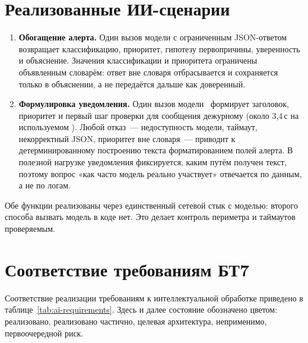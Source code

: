 \documentclass[utf8x, 12pt]{G7-32} %
\begin{document}
\section{Реализованные ИИ-сценарии}
\begin{enumerate}[1.]
    \item \textbf{Обогащение алерта.} Один вызов модели с ограниченным JSON-ответом
          возвращает классификацию, приоритет, гипотезу первопричины,
          уверенность и объяснение. Значения классификации и приоритета
          ограничены объявленным словарём: ответ вне словаря отбрасывается и
          сохраняется только в объяснении, а не передаётся дальше как
          доверенный.
    \item \textbf{Формулировка уведомления.} Один вызов модели~\cite{qwen2024} формирует
          заголовок, приоритет и первый шаг проверки для сообщения дежурному
          (около 3,4\,с на используемом ). Любой отказ~--- недоступность
          модели, таймаут, некорректный JSON, приоритет вне словаря~--- приводит
          к детерминированному построению текста форматированием полей алерта.
          В полезной нагрузке уведомления фиксируется, каким путём получен
          текст, поэтому вопрос «как часто модель реально участвует» отвечается
          по данным, а не по логам.
\end{enumerate}

Обе функции реализованы через единственный сетевой стык с
моделью: второго способа вызвать модель в коде нет. Это делает контроль
периметра и таймаутов проверяемым.

\section{Соответствие требованиям БТ7}
Соответствие реализации требованиям к интеллектуальной обработке приведено в
таблице~\ref{tab:ai-requirements}. Здесь и далее состояние обозначено цветом:
\colorbox{cdone}{реализовано}, \colorbox{cpart}{реализовано частично},
\colorbox{cplan}{целевая архитектура}, \colorbox{cna}{неприменимо},
\colorbox{crisk}{первоочередной риск}.
\end{document}
